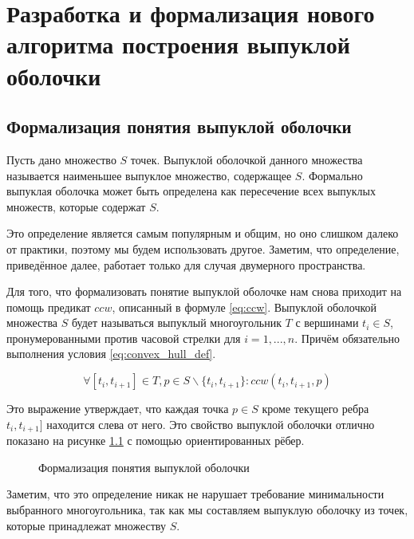 \chapter{Разработка и формализация нового алгоритма построения выпуклой оболочки} \label{chapt2}

\section{Формализация понятия выпуклой оболочки} \label{sect2_1}

Пусть дано множество $S$ точек. Выпуклой оболочкой данного множества называется наименьшее выпуклое множество, содержащее $S$. Формально выпуклая оболочка может быть определена как пересечение всех выпуклых множеств, которые содержат $S$.

Это определение является самым популярным и общим, но оно слишком далеко от практики, поэтому мы будем использовать другое. Заметим, что определение, приведённое далее, работает только для случая двумерного пространства.

Для того, что формализовать понятие выпуклой оболочке нам снова приходит на помощь предикат $ccw$, описанный в формуле \ref{eq:ccw}. Выпуклой оболочкой множества $S$ будет называться выпуклый многоугольник $T$ с вершинами $t_i \in S$, пронумерованными против часовой стрелки для $i = 1,...,n$. Причём обязательно выполнения условия \ref{eq:convex_hull_def}.

\begin{equation}\label{eq:convex_hull_def}
\forall [t_i, t_{i+1}] \in T, p \in S \backslash \{ t_i, t_{i+1} \} : ccw(t_i, t_{i+1}, p)
\end{equation}

Это выражение утверждает, что каждая точка $p \in S$ кроме текущего ребра $t_i, t_{i+1}]$ находится слева от него. Это свойство выпуклой оболочки отлично показано на рисунке \ref{img:convex_hull_def} с помощью ориентированных рёбер.

\begin{figure}[H]
	{\centering
		\hfill
		\hfill
		\hfill
	}
	\caption{Формализация понятия выпуклой оболочки}
	\label{img:convex_hull_def}
\end{figure}

Заметим, что это определение никак не нарушает требование минимальности выбранного многоугольника, так как мы составляем выпуклую оболочку из точек, которые принадлежат множеству $S$.

